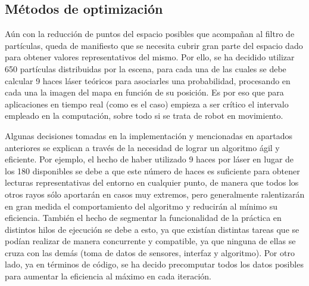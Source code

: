 \subsection{Métodos de optimización}
Aún con la reducción de puntos del espacio posibles que acompañan al filtro de partículas, queda de manifiesto que se necesita cubrir gran parte del espacio dado para obtener valores representativos del mismo. Por ello, se ha decidido utilizar 650 partículas distribuidas por la escena, para cada una de las cuales se debe calcular 9 haces láser teóricos para asociarles una probabilidad, procesando en cada una la imagen del mapa en función de su posición. Es por eso que para aplicaciones en tiempo real (como es el caso) empieza a ser crítico el intervalo empleado en la computación, sobre todo si se trata de robot en movimiento. 

Algunas decisiones tomadas en la implementación y mencionadas en apartados anteriores se explican a través de la necesidad de lograr un algoritmo ágil y eficiente. Por ejemplo, el hecho de haber utilizado 9 haces por láser en lugar de los 180 disponibles se debe a que este número de haces es suficiente para obtener lecturas representativas del entorno en cualquier punto, de manera que todos los otros rayos sólo aportarán en casos muy extremos, pero generalmente ralentizarán en gran medida el comportamiento del algoritmo y reducirán al mínimo su eficiencia. 
También el hecho de segmentar la funcionalidad de la práctica en distintos hilos de ejecución se debe a esto, ya que existían distintas tareas que se podían realizar de manera concurrente y compatible, ya que ninguna de ellas se cruza con las demás (toma de datos de sensores, interfaz y algoritmo).
Por otro lado, ya en términos de código, se ha decido precomputar todos los datos posibles para aumentar la eficiencia al máximo en cada iteración.

